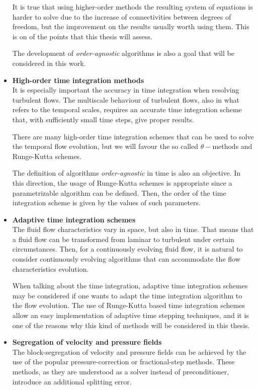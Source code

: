 \begin{itemize}
It is true that using higher-order methods the resulting system of equations is harder to solve due to the increase of connectivities between degrees of freedom, but the improvement on the results usually worth using them. This is on of the points that this thesis will assess.

The development of \textit{order-agnostic} algorithms is also a goal that will be considered in this work.

\item {\bf High-order time integration methods}\\
It is especially important the accuracy in time integration when resolving turbulent flows. The multiscale behaviour of turbulent flows, also in what refers to the temporal scales, requires an accurate time integration scheme that, with sufficiently small time steps, give proper results.

There are many high-order time integration schemes that can be used to solve the temporal flow evolution, but we will favour the so called $ \theta- $methods and Runge-Kutta schemes.

The definition of algorithms \textit{order-agnostic} in time is also an objective. In this direction, the usage of Runge-Kutta schemes is appropriate since a parametrizable algorithm can be defined. Then, the order of the time integration scheme is given by the values of such parameters.

\item {\bf Adaptive time integration schemes}\\
The fluid flow characteristics vary in space, but also in time. That means that a fluid flow can be transformed from laminar to turbulent under certain circumstances. Then, for a continuously evolving fluid flow, it is natural to consider continuously evolving algorithms that can accommodate the flow characteristics evolution. 

When talking about the time integration, adaptive time integration schemes may be considered if one wants to adapt the time integration algorithm to the flow evolution. The use of Runge-Kutta based time integration schemes allow an easy implementation of adaptive time stepping techniques, and it is one of the reasons why this kind of methods will be considered in this thesis.

\item {\bf Segregation of velocity and pressure fields}\\
The block-segregation of velocity and pressure fields can be achieved by the use of the popular pressure-correction or fractional-step methods. These methods, as they are understood as a solver instead of preconditioner, introduce an additional splitting error.


\end{itemize}
